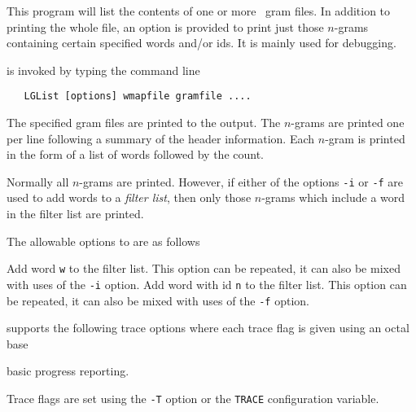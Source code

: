 %
%
%

\newpage
{}


This program will list the contents of one or more \HLM\ gram files.
In addition to printing the whole file, an option is provided to print
just those $n$-grams containing certain specified words and/or ids.  It
is mainly used for debugging.


 is invoked by typing the command line
\begin{verbatim}
   LGList [options] wmapfile gramfile ....
\end{verbatim}
The specified gram files are printed to the output. The $n$-grams are
printed one per line following a summary of the header information.
Each $n$-gram is printed in the form of a list of words followed by the
count.

Normally all $n$-grams are printed. However, if either of the options
\texttt{-i} or \texttt{-f} are used to add words to a \textit{filter
list}, then only those $n$-grams which include a word in the filter list
are printed.

The allowable options to  are as follows

\begin{optlist}
  Add word \texttt{w} to the filter list.  This option
     can be repeated, it can also be mixed with uses of the
     \texttt{-i} option.
  Add word with id \texttt{n} to the filter list.  This
     option can be repeated, it can also be mixed with uses of the
     \texttt{-f} option.
\end{optlist}


 supports the following trace options where each
trace flag is given using an octal base
\begin{optlist}

  basic progress reporting. 
\end{optlist}
Trace flags are set using the \texttt{-T} option or the  \texttt{TRACE} 
configuration variable.







